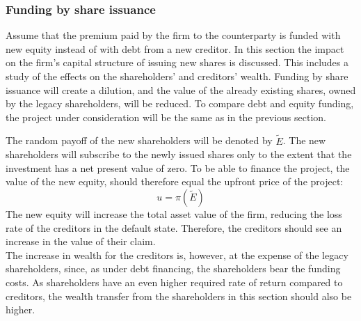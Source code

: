 \documentclass[main.tex]{subfiles}
\begin{document}
    \subsubsection{Funding by share issuance}
    \label{sec:example-equity-issuance}
        Assume that the premium paid by the firm to the counterparty is funded with new equity instead of with debt from a new creditor. 
        In this section the impact on the firm's capital structure of issuing new shares is discussed.
        This includes a study of the effects on the shareholders' and creditors' wealth. 
        Funding by share issuance will create a dilution, and the value of the already existing shares, owned by the legacy shareholders, will be reduced. 
        To compare debt and equity funding, 
        the project under consideration will be the same as in the previous section.

        The random payoff of the new shareholders will be denoted by $\tilde{E}$.
        The new shareholders will subscribe to the newly issued shares 
        only to the extent that the investment has a net present value of zero.
        To be able to finance the project, the value of the new equity,
        should therefore equal the upfront price of the project:
        \begin{equation}\label{eqn:derivative-zero-npv}
            u = \pi(\tilde{E})
        \end{equation}
        The new equity will increase the total asset value of the firm,
        reducing the loss rate of the creditors in the default state.
        Therefore, the creditors should see an increase in the value of their claim.\\
        The increase in wealth for the creditors is, however, at the expense of the legacy shareholders,
        since, as under debt financing, the shareholders bear the funding costs.
        As shareholders have an even higher required rate of return compared to creditors,
        the wealth transfer from the shareholders in this section should also be higher.
\end{document}
